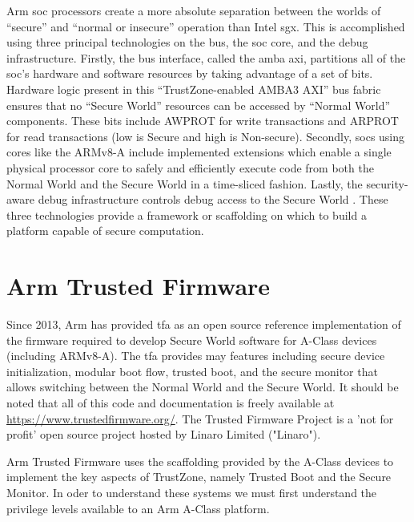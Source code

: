 Arm \gls{soc} processors create a more absolute separation between the worlds of “secure” and “normal or insecure” operation than Intel \gls{sgx}. This is accomplished using three principal technologies on the bus, the \gls{soc} core, and the debug infrastructure. Firstly, the bus interface, called the \gls{amba} \gls{axi}, partitions all of the \gls{soc}’s hardware and software resources by taking advantage of a set of bits. Hardware logic present in this “TrustZone-enabled AMBA3 AXI” bus fabric ensures that no “Secure World” resources can be accessed by “Normal World” components. These bits include AWPROT for write transactions and ARPROT for read transactions (low is Secure and high is Non-secure). Secondly, \gls{soc}s using cores like the ARMv8-A include implemented extensions which enable a single physical processor core to safely and efficiently execute code from both the Normal World and the Secure World in a time-sliced fashion. Lastly, the security-aware debug infrastructure controls debug access to the Secure World \cite{ArmWhitepaper}. These three technologies provide a framework or scaffolding on which to build a platform capable of secure computation.
\section{Arm Trusted Firmware}
Since 2013, Arm has provided \gls{tfa} as an open source reference implementation of the firmware required to develop Secure World software for A-Class devices (including ARMv8-A). The \gls{tfa} provides may features including secure device initialization, modular boot flow, trusted boot, and the secure monitor that allows switching between the Normal World and the Secure World. It should be noted that all of this code and documentation is freely available at \url{https://www.trustedfirmware.org/}. The Trusted Firmware Project is a 'not for profit' open source project hosted by Linaro Limited ("Linaro").

Arm Trusted Firmware uses the scaffolding provided by the A-Class devices to implement the key aspects of TrustZone, namely Trusted Boot and the Secure Monitor. In oder to understand these systems we must first understand the privilege levels available to an Arm A-Class platform.

